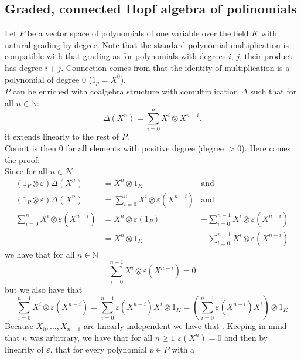 \documentclass[a4paper, 12pt]{report}
\begin{document}
\subsection{Graded, connected Hopf algebra of polinomials}
Let $P$ be a vector space of polynomials of one variable over the field $K$ with natural grading by degree.
Note that the standard polynomial multiplication is compatible with that grading as for polynomials with
degrees $i$, $j$, their product has degree $i + j$. Connection comes from that the identity of
multiplication
is a polynomial of degree $0$ ($1_p = X^0$).  \\
$P$ can be enriched with coalgebra structure with comultiplication $\Delta$ such that for all
$n \in \mathbb{N}$:
\begin{equation*}
\Delta(X^n) = \sum^n_{i = 0} X^i \otimes X^{n-i}.
\end{equation*}
it extends linearly to the rest of $P$. \\
Counit is then $0$ for all elements with positive degree (degree $>0$). Here comes the proof: \\
Since for all $n \in \mathcal{N}$
\begin{align*}
(1_P \otimes \varepsilon )\Delta(X^n) &= X^n \otimes 1_K &\mathrm{and} \\
(1_P \otimes \varepsilon )\Delta(X^n) &= \sum^n_{i = 0} X^i \otimes \varepsilon(X^{n-i}) &\mathrm{and} \\
\sum^n_{i = 0} X^i \otimes \varepsilon(X^{n-i}) &= X^n \otimes \varepsilon(1_P) &+
\sum^{n-1}_{i=0} X^i \otimes \varepsilon(X^{n-i}) \\ &=
X^n \otimes 1_K &+ \sum^{n-1}_{i=0} X^i \otimes \varepsilon(X^{n-i})
\end{align*}
we have that for all $n \in \mathbb{N}$
\begin{equation*}
\sum^{n-1}_{i=0} X^i \otimes \varepsilon(X^{n-i}) = 0
\end{equation*}
but we also have that
\begin{equation*}
\sum^{n-1}_{i=0} X^i \otimes \varepsilon(X^{n-i}) = \sum^{n-1}_{i=0} \varepsilon(X^{n-i})X^i \otimes 1_K =
\left( \sum^{n-1}_{i=0} \varepsilon(X^{n-i})X^i \right)\otimes 1_K
\end{equation*}
Because $X_0, \dots, X_{n-1}$ are linearly independent we have that . Keeping in mind that $n$ was arbitrary, we have that for all $n \geq 1$
$\varepsilon(X^n) = 0$ and then by linearity of $\varepsilon$, that for every polynomial $p \in P$ with a
\end{document}
